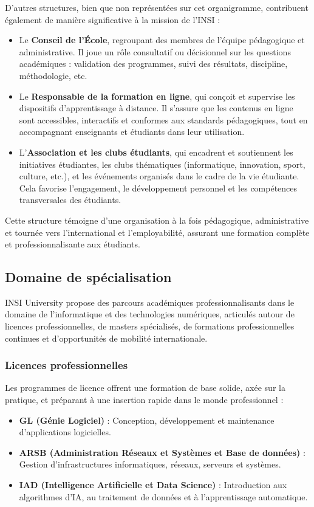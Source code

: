 \documentclass[a4paper,12pt, oneside]{article}
\begin{document}
D’autres structures, bien que non représentées sur cet organigramme, contribuent également de manière significative à la mission de l’INSI :
\begin{itemize}
    \item Le \textbf{Conseil de l’École}, regroupant des membres de l’équipe pédagogique et administrative. Il joue un rôle consultatif ou décisionnel sur les questions académiques : validation des programmes, suivi des résultats, discipline, méthodologie, etc.
    \item Le \textbf{Responsable de la formation en ligne}, qui conçoit et supervise les dispositifs d’apprentissage à distance. Il s’assure que les contenus en ligne sont accessibles, interactifs et conformes aux standards pédagogiques, tout en accompagnant enseignants et étudiants dans leur utilisation.
    \item L’\textbf{Association et les clubs étudiants}, qui encadrent et soutiennent les initiatives étudiantes, les clubs thématiques (informatique, innovation, sport, culture, etc.), et les événements organisés dans le cadre de la vie étudiante. Cela favorise l’engagement, le développement personnel et les compétences transversales des étudiants.
\end{itemize}

Cette structure témoigne d’une organisation à la fois pédagogique, administrative et tournée vers l’international et l’employabilité, assurant une formation complète et professionnalisante aux étudiants.
\subsection{Domaine de spécialisation}

INSI University propose des parcours académiques professionnalisants dans le domaine de l’informatique et des technologies numériques, articulés autour de licences professionnelles, de masters spécialisés, de formations professionnelles continues et d’opportunités de mobilité internationale.

\subsubsection{Licences professionnelles}

Les programmes de licence offrent une formation de base solide, axée sur la pratique, et préparant à une insertion rapide dans le monde professionnel :

\begin{itemize}
    \item \textbf{GL (Génie Logiciel)} : Conception, développement et maintenance d'applications logicielles.
    \item \textbf{ARSB (Administration Réseaux et Systèmes et Base de données)} : Gestion d’infrastructures informatiques, réseaux, serveurs et systèmes.
    \item \textbf{IAD (Intelligence Artificielle et Data Science)} : Introduction aux algorithmes d’IA, au traitement de données et à l’apprentissage automatique.
\end{itemize}
\end{document}
